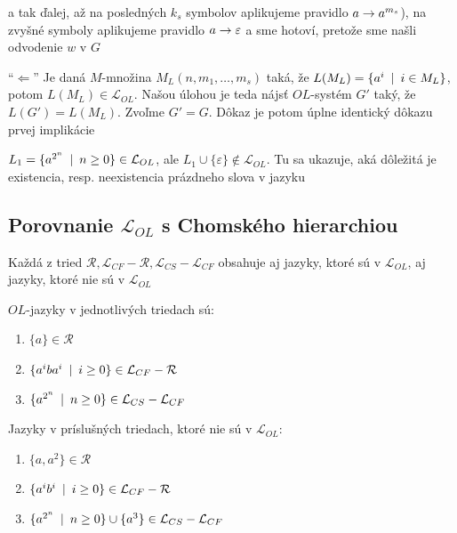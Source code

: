 \begin{dokaz}
\begin{description}
\begin{description}
    a tak ďalej, až na posledných $k_{s}$ symbolov aplikujeme pravidlo
    $a\rightarrow a^{m_{s}}$), na zvyšné symboly aplikujeme pravidlo
    $a\rightarrow\varepsilon$ a sme hotoví, pretože sme našli odvodenie $w$ v
    $G$
    \end{description}
    \item{``$\Leftarrow$''} Je daná $M$-množina
    $M_{L}(n,m_{1},\dots,m_{s})$ taká, že $L(M_{L})=\{a^{i}\enspace |\enspace i\in
    M_{L}\}$, potom $L(M_{L})\in\mathcal{L}_{OL}$. Našou úlohou je
    teda nájsť $OL$-systém $G'$ taký, že $L(G')=L(M_{L})$. Zvoľme
    $G'=G$. Dôkaz je potom úplne identický dôkazu prvej implikácie
    \end{description}
\end{dokaz}

\begin{poznamka}
    $L_{1}=\{a^{2^{n}}\enspace |\enspace n\geq0\}\in\mathcal{L}_{OL}$, ale
    $L_{1}\cup\{\varepsilon\}\not\in\mathcal{L}_{OL}$. Tu sa ukazuje,
    aká dôležitá je existencia, resp. neexistencia prázdneho slova v
    jazyku
\end{poznamka}

\subsection{Porovnanie $\mathcal{L}_{OL}$ s Chomského hierarchiou}

\begin{veta}
    Každá z tried $\mathcal{R},\mathcal{L}_{CF} - \mathcal{R},
    \mathcal{L}_{CS} - \mathcal{L}_{CF}$ obsahuje aj jazyky, ktoré sú
    v $\mathcal{L}_{OL}$, aj jazyky, ktoré nie sú v $\mathcal{L}_{OL}$
\end{veta}

\begin{dokaz}
    $OL$-jazyky v jednotlivých triedach sú:

    \begin{enumerate}
    \item $\{a\}\in\mathcal{R}$
    \item $\{a^{i}ba^{i}\enspace |\enspace i\geq0\}\in\mathcal{L}_{CF} - \mathcal{R}$
    \item $\{a^{2^{n}}\enspace |\enspace n\geq0\}\in\mathcal{L}_{CS} - \mathcal{L}_{CF}$
    \end{enumerate}

    Jazyky v príslušných triedach, ktoré nie sú v $\mathcal{L}_{OL}$:

    \begin{enumerate}
    \item $\{a,a^{2}\}\in\mathcal{R}$
    \item $\{a^{i}b^{i}\enspace |\enspace i\geq0\}\in\mathcal{L}_{CF} - \mathcal{R}$
    \item $\{a^{2^{n}}\enspace |\enspace n\geq0\}\cup\{a^{3}\}\in\mathcal{L}_{CS}
    - \mathcal{L}_{CF}$
    \end{enumerate}
\end{dokaz}

